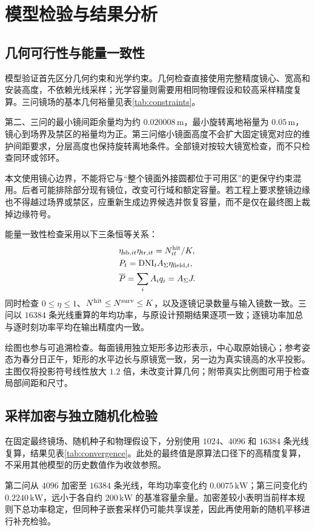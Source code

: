 \section{模型检验与结果分析}
\subsection{几何可行性与能量一致性}
模型验证首先区分几何约束和光学约束。几何检查直接使用完整精度镜心、宽高和安装高度，不依赖光线采样；光学容量则需要用相同物理假设和较高采样精度复算。三问镜场的基本几何裕量见表\ref{tab:constraints}。

第二、三问的最小镜间距余量均为约 $0.020008\,\mathrm m$，最小旋转离地裕量为 $0.05\,\mathrm m$，镜心到场界及禁区的裕量均为正。第三问缩小镜面高度不会扩大固定镜宽对应的维护间距要求，分层高度也保持旋转离地条件。全部镜对按较大镜宽检查，而不只检查同环或邻环。

本文使用镜心边界，不能将它与“整个镜面外接圆都位于可用区”的更保守约束混用。后者可能排除部分现有镜位，改变可行域和额定容量。若工程上要求整镜边缘也不得越过场界或禁区，应重新生成边界候选并恢复容量，而不是仅在最终图上裁掉边缘符号。

能量一致性检查采用以下三条恒等关系：
\begin{align}
&\eta_{{\rm sb},it}\eta_{{\rm tr},it}=N^{\rm hit}_{it}/K,\\
&P_t=\mathrm{DNI}_t A_\Sigma\eta_{{\rm field},t},\\
&\overline{P}=\sum_i A_iq_i=A_\Sigma J.
\end{align}
同时检查 $0\le\eta\le1$、$N^{\rm hit}\le N^{\rm surv}\le K$，以及逐镜记录数量与输入镜数一致。三问以 $16384$ 条光线重算的年均功率，与原设计预期结果逐项一致；逐镜功率加总与逐时刻功率平均在输出精度内一致。

绘图也参与可追溯检查。每面镜用独立矩形多边形表示，中心取原始镜心；参考姿态为春分日正午，矩形的水平边长与原镜宽一致，另一边为真实镜高的水平投影。主图仅将投影符号线性放大 $1.2$ 倍，未改变计算几何；附带真实比例图可用于检查局部间距和尺寸。

\pagepart
\subsection{采样加密与独立随机化检验}
在固定最终镜场、随机种子和物理假设下，分别使用 $1024$、$4096$ 和 $16384$ 条光线复算，结果见表\ref{tab:convergence}。此处的最终值是原算法口径下的高精度复算，不采用其他模型的历史数值作为收敛参照。

第二问从 $4096$ 加密至 $16384$ 条光线，年均功率变化约 $0.0075\,\mathrm{kW}$；第三问变化约 $0.2240\,\mathrm{kW}$，远小于各自约 $200\,\mathrm{kW}$ 的基准容量余量。加密差较小表明当前样本规则下总功率稳定，但同种子嵌套采样仍可能共享误差，因此再使用新的随机平移进行补充检验。

